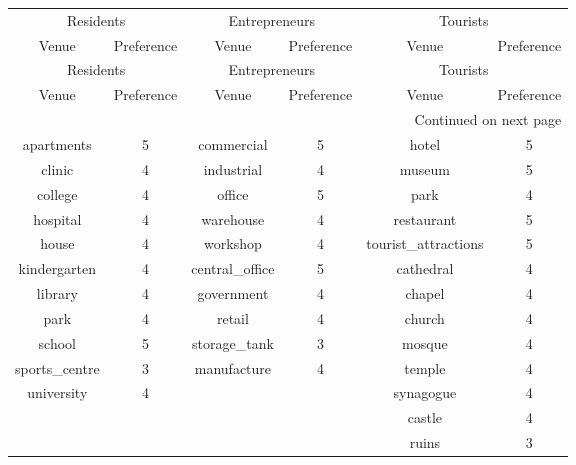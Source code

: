 \documentclass{mcmthesis}
\begin{document}
\vspace{2mm}
\begin{longtable}{*{6}{c}}  %
  \toprule
  \multicolumn{2}{c}{Residents} & \multicolumn{2}{c}{Entrepreneurs} & \multicolumn{2}{c}{Tourists} \\
  \cmidrule(lr){1-2} \cmidrule(lr){3-4} \cmidrule(lr){5-6}
  Venue & Preference & Venue & Preference & Venue & Preference \\
  \midrule
  \endfirsthead

  \toprule
  \multicolumn{2}{c}{Residents} & \multicolumn{2}{c}{Entrepreneurs} & \multicolumn{2}{c}{Tourists} \\
  \cmidrule(lr){1-2} \cmidrule(lr){3-4} \cmidrule(lr){5-6}
  Venue & Preference & Venue & Preference & Venue & Preference \\
  \midrule
  \endhead

  \midrule
  \multicolumn{6}{r}{Continued on next page} \\
  \endfoot

  \bottomrule
  \endlastfoot

  apartments       & 5 & commercial         & 5 & hotel              & 5 \\
  clinic           & 4 & industrial         & 4 & museum             & 5 \\
  college          & 4 & office             & 5 & park               & 4 \\
  hospital         & 4 & warehouse          & 4 & restaurant         & 5 \\
  house            & 4 & workshop           & 4 & tourist\_attractions &5 \\
  kindergarten     & 4 & central\_office     &5 & cathedral          &4 \\
  library          & 4 & government         &4 & chapel             &4 \\
  park             & 4 & retail             &4 & church             &4 \\
  school           & 5 & storage\_tank       &3 & mosque             &4 \\
  sports\_centre   &3  & manufacture        &4 & temple             &4 \\
  university       &4  &                    &   & synagogue          &4 \\
  \addlinespace[2pt]
                     &   &                    &   & castle             &4 \\
  \addlinespace[2pt]
                     &   &                    &   & ruins              &3 \\

\end{longtable}
\end{document}
